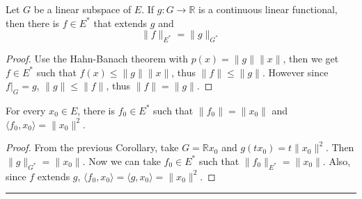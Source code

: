 \begin{cor} Let $G$ be a linear subspace of $E$. If $g:G\rightarrow \mathbb{R}$ is a continuous linear functional, then there is $f\in E^*$ that extends $g$ and
\begin{equation}
\|f\|_{E^*}=\|g\|_{G^*}
\end{equation}
\end{cor}
\begin{proof}
Use the Hahn-Banach theorem with $p(x)=\|g\|\|x\|$, then we get $f\in E^*$ such that $f(x)\leq \|g\|\|x\|$, thus $\|f\|\leq \|g\|$. However since $f|_G=g$, $\|g\|\leq \|f\|$, thus $\|f\|=\|g\|$.
\end{proof}
\begin{cor} For every $x_0\in E$, there is $f_0\in E^*$ such that $\|f_0\|=\|x_0\|$ and $\langle f_0,x_0\rangle=\|x_0\|^2$.
\end{cor}
\begin{proof} From the previous Corollary, take $G=\mathbb{R}x_0$ and $g(tx_0)=t\|x_0\|^2$. Then $\|g\|_{G^*}=\|x_0\|$. Now we can take $f_0\in E^*$ such that $\|f_0\|_{E^*}=\|x_0\|$. Also, since $f$ extends $g$, $\langle f_0,x_0\rangle=\langle g,x_0\rangle=\|x_0\|^2$.
\end{proof}
\noindent\rule{\textwidth}{1pt}
\newline
